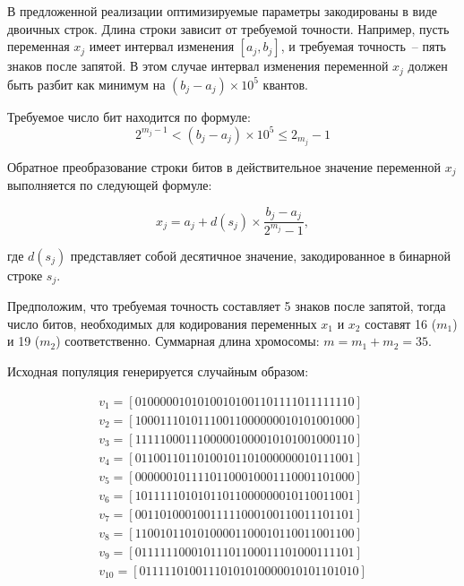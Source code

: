 В предложенной реализации оптимизируемые параметры закодированы в виде двоичных строк. Длина строки
зависит от требуемой точности. Например, пусть переменная $x_{j}$ имеет интервал изменения $[a_j, b_j]$,
и требуемая точность~-- пять знаков после запятой. В этом случае интервал изменения переменной $x_j$
должен быть разбит как минимум на $(b_j - a_j) \times 10^{5}$ квантов.

Требуемое число бит находится по формуле:
\begin{equation}
  2^{m_j -1} < (b_j - a_j) \times 10^{5} \leq 2_{m_j} -1
\end{equation}

Обратное преобразование строки битов в действительное значение переменной $x_j$ выполняется по
следующей формуле:

\begin{equation}
  x_j = a_j + d(s_j) \times \frac{b_j - a_j}{2^{m_j} - 1},
\end{equation}

где $d(s_j)$ представляет собой десятичное значение, закодированное в бинарной строке $s_j$.

Предположим, что требуемая точность составляет 5 знаков после запятой, тогда число битов,
необходимых для кодирования переменных $x_1$ и $x_2$ составят 16 ($m_1$) и 19 ($m_2$) соответственно.
Суммарная длина хромосомы: $m=m_1+m_2 = 35$.

Исходная популяция генерируется случайным образом:

\begin{equation*}
  \begin{array}{l}
  v_1 = [01000001010100101001101111011111110] \\
  v_2 = [10001110101110011000000010101001000] \\
  v_3 = [11111000111000001000010101001000110] \\
  v_4 = [01100110110100101101000000010111001] \\
  v_5 = [00000010111101100010001110001101000] \\
  v_6 = [10111110101011011000000010110011001] \\
  v_7 = [00110100010011111000100110011101101] \\
  v_8 = [11001011010100001100010110011001100] \\
  v_9 = [01111110001011101100011101000111101] \\
  v_{10} = [01111101001110101010000010101101010]
  \end{array}
\end{equation*}

